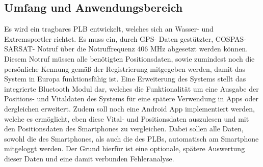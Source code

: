 \subsection{Umfang und Anwendungsbereich}
Es wird ein tragbares PLB entwickelt, welches sich an Wasser- und Extremsportler richtet. Es muss ein, durch GPS- Daten gestützter, COSPAS- SARSAT- Notruf über die Notruffrequenz 406 MHz abgesetzt werden können. Diesem Notruf müssen alle benötigten Positionsdaten, sowie zumindest noch die persönliche Kennung gemäß der Registrierung mitgegeben werden, damit das System in Europa funktionsfähig ist. Eine Erweiterung des Systems stellt das integrierte Bluetooth Modul dar, welches die Funktionalität um eine Ausgabe der Positions- und Vitaldaten des Systems für eine spätere Verwendung in Apps oder dergleichen erweitert. Zudem soll noch eine Android App implementiert werden, welche es ermöglicht, eben diese Vital- und Positionsdaten auszulesen und mit den Positionsdaten des Smartphones zu vergleichen. Dabei sollen alle Daten, sowohl die des Smartphones, als auch die des PLBs, automatisch am Smartphone mitgeloggt werden. Der Grund hierfür ist eine optionale, spätere Auswertung dieser Daten und eine damit verbunden Fehleranalyse.
